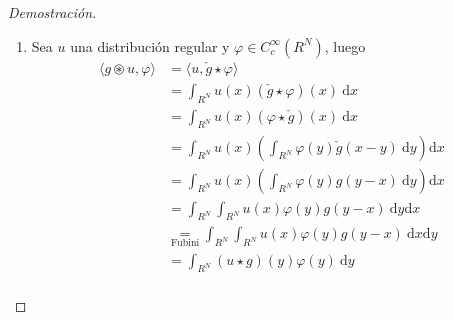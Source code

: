 \documentclass[10pt,a4paper]{report}
\newcommand{\abs}[2][y]{\if#1y\left\fi\lvert#2\if#1y\right\fi\rvert}
\newcommand{\norm}[2][y]{{\if#1y\left\fi\lVert#2\if#1y\right\fi\rVert}}
\theoremstyle{definition}
\renewcommand{\theproblem}{\Alph{problem}}
\numberwithin{equation}{problem}
\providecommand{\abs}[1]{\left\lvert#1\right\rvert}
\providecommand{\norm}[1]{\left\lVert#1\right\rVert}
\begin{document}
\begin{proof}[\textcolor{rojo}{Demostración}]
\begin{enumerate}[label=\textbf{\theproblem.\arabic{*}.},ref=\theproblem.\arabic{*},parsep=1ex]
    	   Sea, $K\subset R^{N}$ un compacto y $\varphi\in C_{c}^{\infty}(R^{N})$ con $\text{supp}(\varphi)\subset K$. Luego, $\text{supp}(\check{g}\star \varphi)\subset \text{supp}(\check{g}) + K$, dado que $A := \text{supp}(\check{g})+K$ es un conjunto compacto contenido en $R^{N}$, se tiene, ya que $u$ es una distribución, la existencia de las constantes $C(K)>0$ y $m(K)\in\mathbb{N}$ tales que
    	   \begin{align*}
    	   	\abs{\langle g\circledast u,\varphi \rangle} &= \abs{\langle  u,\check{g}\star \varphi\rangle}\\ &\leq C(K)\max_{\abs{\alpha} \leq m(K)}\norm{D^{\alpha}\left(\check{g}\star \varphi\right)}_{\infty}\\ &= C(K)\max_{\abs{\alpha}\leq m(K)}\norm{D^{\alpha}\left(\varphi\star\check{g}\right)}_{\infty}\\ &= C(K)\max_{\abs{\alpha}\leq m(K)}\norm{D^{\alpha}\left(\varphi\right)\star \check{g}}_{\infty}\\
    	   	&\leq C(K)\max_{\abs{\alpha}\leq m(K)}\norm{D^{\alpha}\left(\varphi\right)}_{\infty}\norm{\check{g}}_{1}\\
    	   	&= C(K)\norm{\check{g}}_{1}\max_{\abs{\alpha}\leq m(K)}\norm{D^{\alpha}\left(\varphi\right)}_{\infty}
    	   \end{align*}
           Por tanto $g\circledast u$ es una distribución.
           \item Sea $u$ una distribución regular y $\varphi\in C_{c}^{\infty}(R^{N})$, luego
           \begin{align*}
           	\langle g\circledast u,\varphi \rangle &= \langle u,\check{g}\star \varphi \rangle\\
           	&= \int_{R^{N}}u(x)\left(\check{g}\star \varphi\right)(x)\ \text{d}x\\
           	&= \int_{R^{N}}u(x)\left(\varphi\star\check{g} \right)(x)\ \text{d}x\\
           	&= \int_{R^{N}} u(x) \left(\int_{R^{N}}\varphi(y)\check{g}\left(x-y\right)\ \text{d}y\right)\text{d}x\\
           	&= \int_{R^{N}} u(x) \left(\int_{R^{N}}\varphi(y)g\left(y-x\right)\ \text{d}y\right)\text{d}x\\
           	&= \int_{R^{N}}\int_{R^{N}}u(x)\varphi(y)g(y-x)\ \text{d}y\text{d}x\\
           	&\underset{\text{Fubini}}{=} \int_{R^{N}}\int_{R^{N}}u(x)\varphi(y)g(y-x)\ \text{d}x\text{d}y\\
           	&= \int_{R^{N}}\left(u\star g\right)(y)\varphi(y)\ \text{d}y\\

\end{align*}
\end{enumerate}
\end{proof}
\end{document}
